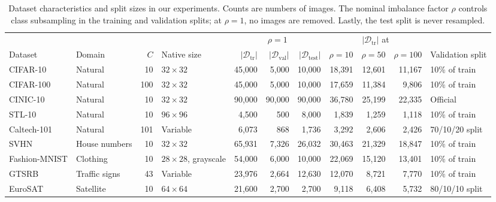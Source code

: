 \documentclass[10pt,journal,compsoc]{IEEEtran}
\theoremstyle{definition}
\begin{document}
\begin{table}[!t]
\centering
\caption{Dataset characteristics and split sizes in our experiments.
Counts are numbers of images. The nominal imbalance factor $\rho$
controls class subsampling in the training and validation splits;
at $\rho=1$, no images are removed. Lastly, the test split is never resampled.}
\label{tab:datasets}
\footnotesize
\setlength{\tabcolsep}{4.5pt}
\begin{tabular}{@{}llrlrrrrrrl@{}}
\toprule
& & & & \multicolumn{3}{c}{$\rho=1$} & \multicolumn{3}{c}{$|\mathcal{D}_{\mathrm{tr}}|$ at} & \\
\cmidrule(lr){5-7}\cmidrule(lr){8-10}
Dataset & Domain & $C$ & Native size & $|\mathcal{D}_{\mathrm{tr}}|$ & $|\mathcal{D}_{\mathrm{val}}|$ & $|\mathcal{D}_{\mathrm{test}}|$ & $\rho=10$ & $\rho=50$ & $\rho=100$ & Validation split \\
\midrule
CIFAR-10      & Natural        & 10  & $32\times32$              & 45{,}000 & 5{,}000  & 10{,}000 & 18{,}391 & 12{,}601 & 11{,}167 & 10\% of train \\
CIFAR-100     & Natural        & 100 & $32\times32$              & 45{,}000 & 5{,}000  & 10{,}000 & 17{,}659 & 11{,}384 & 9{,}806  & 10\% of train \\
CINIC-10      & Natural        & 10  & $32\times32$              & 90{,}000 & 90{,}000 & 90{,}000 & 36{,}780 & 25{,}199 & 22{,}335 & Official \\
STL-10        & Natural        & 10  & $96\times96$              & 4{,}500  & 500      & 8{,}000  & 1{,}839  & 1{,}259  & 1{,}118  & 10\% of train \\
Caltech-101   & Natural        & 101 & Variable                  & 6{,}073  & 868      & 1{,}736  & 3{,}292  & 2{,}606  & 2{,}426  & 70/10/20 split \\
\midrule
SVHN          & House numbers  & 10  & $32\times32$              & 65{,}931 & 7{,}326  & 26{,}032 & 30{,}463 & 21{,}329 & 18{,}847 & 10\% of train \\
Fashion-MNIST & Clothing       & 10  & $28\times28$, grayscale   & 54{,}000 & 6{,}000  & 10{,}000 & 22{,}069 & 15{,}120 & 13{,}401 & 10\% of train \\
GTSRB         & Traffic signs  & 43  & Variable                  & 23{,}976 & 2{,}664  & 12{,}630 & 12{,}070 & 8{,}721  & 7{,}770  & 10\% of train \\
EuroSAT       & Satellite      & 10  & $64\times64$              & 21{,}600 & 2{,}700  & 2{,}700  & 9{,}118  & 6{,}408  & 5{,}732  & 80/10/10 split \\

\end{tabular}
\end{table}
\end{document}

